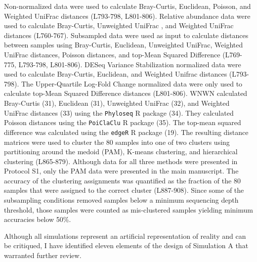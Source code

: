 \documentclass[
]{article}
\begin{document}
Non-normalized data were used to calculate Bray-Curtis, Euclidean,
Poisson, and Weighted UniFrac distances (L793-798, L801-806). Relative
abundance data were used to calculate Bray-Curtis, Unweighted UniFrac ,
and Weighted UniFrac distances (L760-767). Subsampled data were used as
input to calculate distances between samples using Bray-Curtis,
Euclidean, Unweighted UniFrac, Weighted UniFrac distances, Poisson
distances, and top-Mean Squared Difference (L769-775, L793-798,
L801-806). DESeq Variance Stabilization normalized data were used to
calculate Bray-Curtis, Euclidean, and Weighted Unifrac distances
(L793-798). The Upper-Quartile Log-Fold Change normalized data were only
used to calculate top-Mean Squared Difference distances (L801-806). WNWN
calculated Bray-Curtis (31), Euclidean (31), Unweighted UniFrac (32),
and Weighted UniFrac distances (33) using the \texttt{Phyloseq} R
package (34). They calculated Poisson distances using the
\texttt{PoiClaClu} R package (35). The top-mean squared difference was
calculated using the \texttt{edgeR} R package (19). The resulting
distance matrices were used to cluster the 80 samples into one of two
clusters using partitioning around the medoid (PAM), K-means clustering,
and hierarchical clustering (L865-879). Although data for all three
methods were presented in Protocol S1, only the PAM data were presented
in the main manuscript. The accuracy of the clustering assignments was
quantified as the fraction of the 80 samples that were assigned to the
correct cluster (L887-908). Since some of the subsampling conditions
removed samples below a minimum sequencing depth threshold, those
samples were counted as mis-clustered samples yielding minimum
accuracies below 50\%.

Although all simulations represent an artificial representation of
reality and can be critiqued, I have identified eleven elements of the
design of Simulation A that warranted further review.
\end{document}
